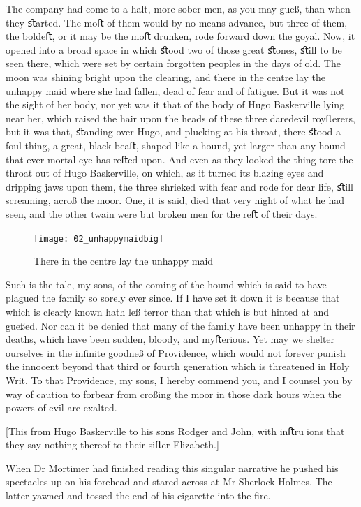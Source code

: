 \documentclass[paper=a5,BCOR=7mm,twoside,DIV=calc,12pt,usegeometry,openany,chapterprefix,endperiod,headings=big]{scrbook} %
\begin{document}
The company had come to a halt, more sober men, as you may gueß, than when they ﬆarted. The moﬅ of them would by no means advance, but three of them, the boldeﬅ, or it may be the moﬅ drunken, rode forward down the goyal. Now, it opened into a broad space in which ﬆood two of those great ﬆones, ﬆill to be seen there, which were set by certain forgotten peoples in the days of old. The moon was shining bright upon the clearing, and there in the centre lay the unhappy maid where she had fallen, dead of fear and of fatigue. But it was not the sight of her body, nor yet was it that of the body of Hugo Baskerville lying near her, which raised the hair upon the heads of these three daredevil royﬅerers, but it was that, ﬆanding over Hugo, and plucking at his throat, there ﬆood a foul thing, a great, black beaﬅ, shaped like a hound, yet larger than any hound that ever mortal eye has reﬅed upon. And even as they looked the thing tore the throat out of Hugo Baskerville, on which, as it turned its blazing eyes and dripping jaws upon them, the three shrieked with fear and rode for dear life, ﬆill screaming, acroß the moor. One, it is said, died that very night of what he had seen, and the other twain were but broken men for the reﬅ of their days.

\begin{figure}[tbph]
\centering
\texttt{[image: 02\_unhappymaidbig]}
\caption{There in the centre lay the unhappy maid}
\end{figure}

Such is the tale, my sons, of the coming of the hound which is said to have plagued the family so sorely ever since. If I have set it down it is because that which is clearly known hath leß terror than that which is but hinted at and gueßed. Nor can it be denied that many of the family have been unhappy in their deaths, which have been sudden, bloody, and myﬅerious. Yet may we shelter ourselves in the inﬁnite goodneß of Providence, which would not forever punish the innocent beyond that third or fourth generation which is threatened in Holy Writ. To that Providence, my sons, I hereby commend you, and I counsel you by way of caution to forbear from croßing the moor in those dark hours when the powers of evil are exalted.

[This from Hugo Baskerville to his sons Rodger and John, with inﬅruions that they say nothing thereof to their siﬅer Elizabeth.]
\clearpage

\normalfont

When Dr Mortimer had finished reading this singular narrative he pushed his spectacles up on his forehead and stared across at Mr Sherlock Holmes. The latter yawned and tossed the end of his cigarette into the fire.
\end{document}
